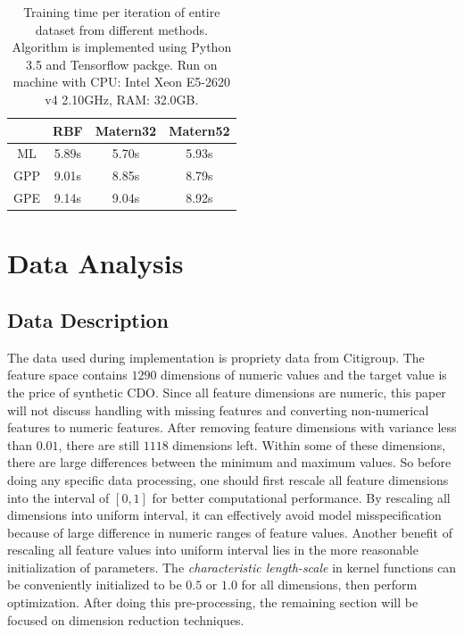 \documentclass[11pt,a4paper]{article}
\theoremstyle{definition}
\numberwithin{equation}{section}
\begin{document}
	\begin{table}
		\centering
		\begin{tabular}{c|ccc} 
			\toprule
			& RBF   & Matern32 & Matern52  \\ 
			\hline\hline
			ML  & 5.89s & 5.70s    & 5.93s     \\
			GPP & 9.01s & 8.85s    & 8.79s     \\
			GPE & 9.14s & 9.04s    & 8.92s     \\
			\bottomrule
		\end{tabular}
		\caption{Training time per iteration of entire dataset from different methods. Algorithm is implemented using Python 3.5 and Tensorflow packge. Run on machine with CPU: Intel Xeon E5-2620 v4 2.10GHz, RAM: 32.0GB.}
		\label{training_time}
	\end{table}
	
	
	\newpage
	\section{Data Analysis}\label{sec:data_analysis}
	
	\subsection{Data Description}
	The data used during implementation is propriety data from Citigroup. The feature space contains $1290$ dimensions of numeric values and the target value is the price of synthetic CDO. Since all feature dimensions are numeric, this paper will not discuss handling with missing features and converting non-numerical features to numeric features. After removing feature dimensions with variance less than $0.01$\footnotemark[3], there are still $1118$ dimensions left. Within some of these dimensions, there are large differences between the minimum and maximum values. So before doing any specific data processing, one should first rescale all feature dimensions into the interval of $[0,1]$ for better computational performance. By rescaling all dimensions into uniform interval, it can effectively avoid model misspecification because of large difference in numeric ranges of feature values\cite{Kotsiantis}. Another benefit of rescaling all feature values into uniform interval lies in the more reasonable initialization of parameters.  The \textit{characteristic length-scale} in kernel functions can be conveniently initialized to be $0.5$ or $1.0$ for all dimensions, then perform optimization. After doing this pre-processing, the remaining section will be focused on dimension reduction techniques.	
	
\end{document}
